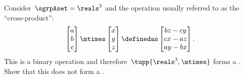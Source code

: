 \begin{exercise}
    \label{ex:cross_prod}
    Consider~$\sgrpAset=\reals^3$ and the operation usually referred to as the ``cross-product'':
    \begin{equation}
        \begin{bmatrix}
            a \\ b\\ c
        \end{bmatrix}
        \mtimes
        \begin{bmatrix}
            x \\ y \\ z
        \end{bmatrix}
        \definedas
        \begin{bmatrix}
            bz-cy \\
            cx-az \\
            ay-bx
        \end{bmatrix}.
    \end{equation}
    This is a binary operation and therefore~$\tupp{\reals^3,\mtimes}$ forms a .
    Show that this does not form a .
\end{exercise}
%
